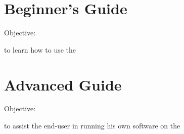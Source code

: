 \documentclass[11pt,a4paper,oneside]{book}
\begin{document}
\pagestyle{empty}



\glsaddall
\glstoctrue
\printglossaries

\cleardoublepage
\printindex


\tableofcontents

\part{Beginner's Guide}

Objective:

to learn how to use the \hpc

\pagestyle{fancy}


















\part{Advanced Guide}

Objective:

to assist the end-user in running his own software on the \hpc













\appendix






\end{document}
